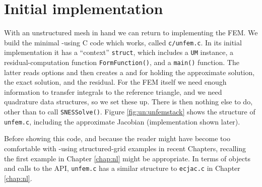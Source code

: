 \section{Initial implementation}

With an unstructured mesh in hand we can return to implementing the FEM.  We build the minimal \pSNES-using C code which works, called \texttt{c/\CODELOC unfem.c}.  In its initial implementation it has a ``context'' \texttt{struct}, which includes a \texttt{UM} instance, a residual-computation function \texttt{FormFunction()}, and a \texttt{main()} function.  The latter reads options and then creates a \pSNES and \pVecs for holding the approximate solution, the exact solution, and the residual.  For the FEM itself we need enough information to transfer integrals to the reference triangle, and we need quadrature data structures, so we set these up.  There is then nothing else to do, other than to call \texttt{SNESSolve()}.  Figure \ref{fig:un:unfemstack} shows the structure of \texttt{unfem.c}, including the approximate Jacobian (implementation shown later).

Before showing this code, and because the reader might have become too comfortable with \pDMDA-using structured-grid examples in recent Chapters, recalling the first example in Chapter \ref{chap:nl} might be appropriate.  In terms of \PETSc objects and calls to the \PETSc API, \texttt{unfem.c} has a similar structure to \texttt{ecjac.c} in Chapter \ref{chap:nl}.

